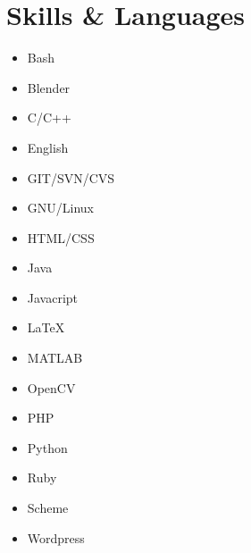 \documentclass[a4paper,10pt]{article}
\begin{document}
\section{Skills \& Languages}
\begin{multicols}{3}
\raggedcolumns
\begin{itemize}
\renewcommand{\labelitemi}{\textcolor{lightg}{\symbol{"00BB}}}
\setlength{\itemsep}{1pt}
\setlength{\parskip}{0pt}
\setlength{\parsep}{0pt}
\item Bash \hfill \fournotes
\item Blender \hfill \threenotes
\item C/C++ \hfill \fournotes 
\item English \hfill \fivenotes
\item GIT/SVN/CVS \hfill \fournotes
\item GNU/Linux \hfill \fournotes
\item HTML/CSS \hfill \fournotes
\item Java \hfill \fivenotes
\item Javacript \hfill \threenotes
\item \LaTeX \hfill \fournotes
\item MATLAB \hfill \fivenotes
\item OpenCV \hfill \fournotes
\item PHP \hfill \fournotes
\item Python \hfill \threenotes
\item Ruby \hfill \onenote
\item Scheme \hfill \fivenotes
\item Wordpress \hfill \fournotes
\end{itemize}
\end{multicols}
\end{document}
